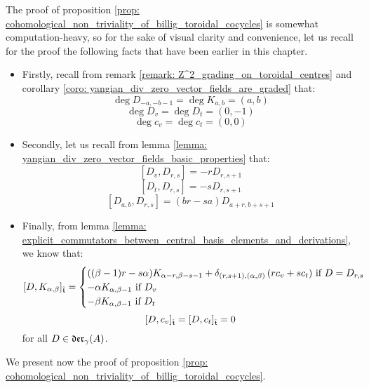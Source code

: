         \begin{remark}
            The proof of proposition \ref{prop: cohomological_non_triviality_of_billig_toroidal_cocycles} is somewhat computation-heavy, so for the sake of visual clarity and convenience, let us recall for the proof the following facts that have been earlier in this chapter.
            \begin{itemize}
                \item Firstly, recall from remark \ref{remark: Z^2_grading_on_toroidal_centres} and corollary \ref{coro: yangian_div_zero_vector_fields_are_graded} that:
                    $$\deg D_{-a, -b - 1} = \deg K_{a, b} = (a, b)$$
                    $$\deg D_v = \deg D_t = (0, -1)$$
                    $$\deg c_v = \deg c_t = (0, 0)$$
                \item Secondly, let us recall from lemma \ref{lemma: yangian_div_zero_vector_fields_basic_properties} that:
                    $$[D_v, D_{r, s}] = -r D_{r, s + 1}$$
                    $$[D_t, D_{r, s}] = -s D_{r, s + 1}$$
                    $$[D_{a, b}, D_{r, s}] = (br - sa) D_{a + r, b + s + 1}$$
                \item Finally, from lemma \ref{lemma: explicit_commutators_between_central_basis_elements_and_derivations}, we know that:
                    $$[D, K_{\alpha, \beta}]_{\hat{\mathfrak{t}}} =
                        \begin{cases}
                            \text{$((\beta - 1)r - s\alpha) K_{\alpha - r, \beta - s - 1} + \delta_{(r, s + 1), (\alpha, \beta)} \left( r c_v + s c_t \right)$ if $D = D_{r, s}$}
                            \\
                            \text{$-\alpha K_{\alpha, \beta - 1}$ if $D_v$}
                            \\
                            \text{$-\beta K_{\alpha, \beta - 1}$ if $D_t$}
                        \end{cases}
                    $$
                    $$[D, c_v]_{\hat{\mathfrak{t}}} = [D, c_t]_{\hat{\mathfrak{t}}} = 0$$
                for all $D \in \mathfrak{der}_{\gamma}(A)$.
            \end{itemize}
        \end{remark}
        We present now the proof of proposition \ref{prop: cohomological_non_triviality_of_billig_toroidal_cocycles}.
